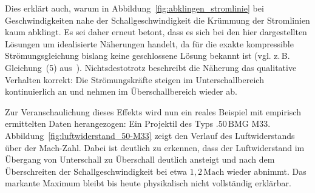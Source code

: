 Dies erklärt auch, warum in Abbildung~\ref{fig:abklingen_stromlinie} 
bei Geschwindigkeiten nahe der Schallgeschwindigkeit die Krümmung 
der Stromlinien kaum abklingt.
Es sei daher erneut betont, dass es sich bei den hier 
dargestellten Lösungen um idealisierte Näherungen handelt,
da für die exakte kompressible Strömungsgleichung bislang 
keine geschlossene Lösung bekannt ist 
(vgl. z.\,B. Gleichung~(5) aus~\cite{Ackeret1928}).
Nichtsdestotrotz beschreibt die Näherung das qualitative Verhalten korrekt:
Die Strömungskräfte steigen im Unterschallbereich 
kontinuierlich an und nehmen im Überschallbereich wieder ab.

Zur Veranschaulichung dieses Effekts wird nun ein reales Beispiel 
mit empirisch ermittelten Daten herangezogen:
Ein Projektil des Typs $.50\,\text{BMG}$ M33.
Abbildung~\ref{fig:luftwiderstand_50-M33} zeigt den Verlauf
des Luftwiderstands über der Mach-Zahl.
Dabei ist deutlich zu erkennen, dass der Luftwiderstand 
im Übergang von Unterschall zu Überschall 
deutlich ansteigt und nach dem Überschreiten der 
Schallgeschwindigkeit bei etwa $1{,}2\,\text{Mach}$ 
wieder abnimmt.
Das markante Maximum bleibt bis heute physikalisch 
nicht vollständig erklärbar.
